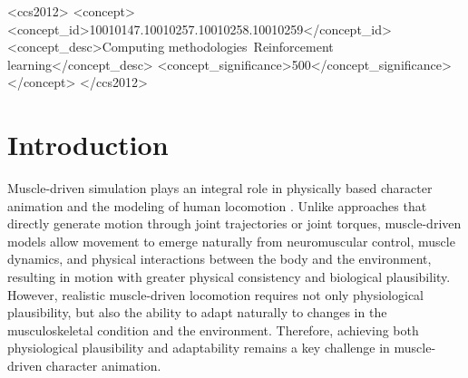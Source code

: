 \documentclass[acmtog,screen]{acmart}
\begin{document}
\begin{abstract}
\end{abstract}

\begin{CCSXML}
<ccs2012>
 <concept>
  <concept_id>10010147.10010257.10010258.10010259</concept_id>
  <concept_desc>Computing methodologies~Reinforcement learning</concept_desc>
  <concept_significance>500</concept_significance>
 </concept>
</ccs2012>
\end{CCSXML}


\maketitle

\section{Introduction}
\label{sec:introduction}
Muscle-driven simulation plays an integral role in physically based character animation and the modeling of human locomotion \cite{sun2024,schumacher2025}. Unlike approaches that directly generate motion through joint trajectories or joint torques, muscle-driven models allow movement to emerge naturally from neuromuscular control, muscle dynamics, and physical interactions between the body and the environment, resulting in motion with greater physical consistency and biological plausibility. However, realistic muscle-driven locomotion requires not only physiological plausibility, but also the ability to adapt naturally to changes in the musculoskeletal condition and the environment. Therefore, achieving both physiological plausibility and adaptability remains a key challenge in muscle-driven character animation.
\end{document}
